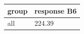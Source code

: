 \begingroup\small
\setlength{\tabcolsep}{3pt}
\renewcommand{\arraystretch}{1.04}
\begin{tabularx}{\linewidth}{XX}
\toprule
group & response B6 \\
\midrule
all & 224.39 \\
\bottomrule
\end{tabularx}
\endgroup
